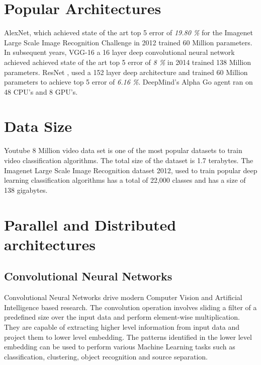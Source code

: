 \documentclass[sigconf]{acmart}
\begin{document}
\section{Popular Architectures}\label{art}

AlexNet\cite{NIPS2012_4824}, which achieved state of the art top 5 error of \textit{19.80 \%} for the Imagenet Large Scale Image Recognition Challenge in 2012 trained 60 Million parameters. In subsequent years, VGG-16 \cite{DBLP:journals/corr/SimonyanZ14a} a 16 layer deep convolutional neural network achieved achieved state of the art top 5 error of \textit{8 \%} in 2014 trained 138 Million parameters. ResNet \cite{DBLP:journals/corr/HeZRS15}, used a 152 layer deep architecture and trained 60 Million parameters to achieve top 5 error of \textit{6.16 \%}. DeepMind's Alpha Go agent ran on 48 CPU's and 8 GPU's. 

\section{Data Size} \label{size}

Youtube 8 Million video data set is one of the most popular datasets to train video classification algorithms. The total size of the dataset is 1.7 terabytes. The Imagenet Large Scale Image Recognition dataset 2012, used to train popular deep learning classification algorithms has a total of 22,000 classes and has a size of 138 gigabytes.  

\section{Parallel and Distributed architectures} \label{parallel}

\subsection{Convolutional Neural Networks}

Convolutional Neural Networks drive modern Computer Vision and Artificial Intelligence based research. The convolution operation involves sliding a filter of a predefined size over the input data and perform element-wise multiplication. They are capable of extracting higher level information from input data and project them to lower level embedding. The patterns identified in the lower level embedding can be used to perform various Machine Learning tasks such as classification, clustering, object recognition and source separation.
\end{document}
